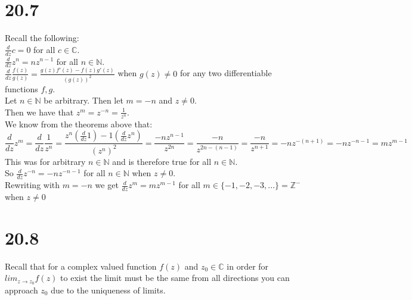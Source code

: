 \documentclass{article}
\begin{document}
\section*{20.7}
\begin{center}
    \doublespacing
    Recall the following:
    \\$\frac{d}{dz} c = 0$ for all $c\in\mathbb{C}$.
    \\$\frac{d}{dz} z^n = n z^{n-1}$ for all $n\in\mathbb{N}$.
    \\$\frac{d}{dz}\frac{f(z)}{g(z)} =\frac{g(z) f'(z) - f(z) g'(z)}{(g(z))^2}$ when $g(z)\neq 0$ for any two differentiable functions $f, g$.
    \break
    \\Let $n\in\mathbb{N}$ be arbitrary. Then let $m = -n$ and $z\neq 0$.
    \\Then we have that $z^m = z^{-n} =\frac{1}{z^n}$.
    \\We know from the theorems above that:
    \[\frac{d}{dz} z^m =\frac{d}{dz}\frac{1}{z^n} =\frac{z^n (\frac{d}{dz} 1) - 1 (\frac{d}{dz} z^n)}{(z^n)^2} =\frac{-n z^{n-1}}{z^{2n}} =\frac{-n}{z^{2n -(n-1)}} =\frac{-n}{z^{n+1}} = -n z^{-(n+1)} = -n z^{-n-1} = mz^{m-1}\]
    This was for arbitrary $n\in\mathbb{N}$ and is therefore true for all $n\in\mathbb{N}$.
    \\So $\frac{d}{dz} z^{-n} = -n z^{-n-1}$ for all $n\in\mathbb{N}$ when $z\neq 0$.
    \\Rewriting with $m = -n$ we get $\frac{d}{dz} z^m = m z^{m-1}$ for all $m\in\{-1, -2, -3, ...\} =\mathbb{Z^-}$ when $z\neq 0$ \qedsymbol
\end{center}


\newpage
\section*{20.8}
\begin{center}
    \doublespacing
    Recall that for a complex valued function $f(z)$ and $z_0\in\mathbb{C}$ in order for $lim _{z\rightarrow z_0} f(z)$ to exist the limit must be the same from all directions you can approach $z_0$ due to the uniqueness of limits.
\end{center}
\end{document}
